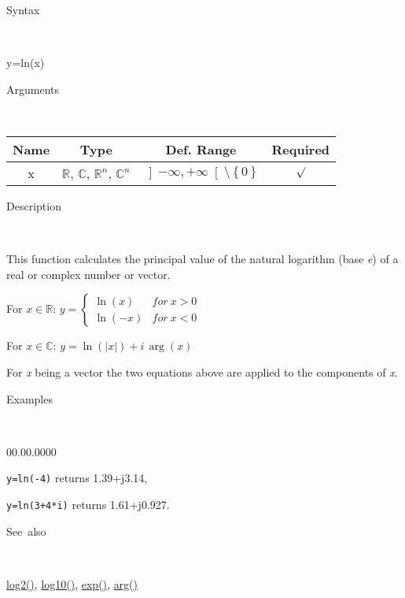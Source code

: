 \begin{description}
\item [Syntax]~
\end{description}
y=ln(x)

\begin{description}
\item [Arguments]~
\end{description}
\begin{tabular}{|c|c|c|c|}
\hline 
Name&
Type&
Def. Range&
Required\tabularnewline
\hline
\hline 
x&
$\mathbb{R}$, $\mathbb{C}$, $\mathbb{R}^{n}$, $\mathbb{C}^{n}$&
$\left]-\infty,+\infty\right[\setminus\left\{ 0\right\} $&
$\surd$\tabularnewline
\hline
\end{tabular}

\begin{description}
\item [Description]~
\end{description}
This function calculates the principal value of the natural logarithm
(base \textit{e}) of a real or complex number or vector.

\medskip{}
For $x\in\mathbb{R}$: $y=\left\{ \begin{array}{cc}
\ln\left(x\right) & for\: x>0\\
\ln\left(-x\right) & for\: x<0\end{array}\right.$ 

\medskip{}
For $x\in\mathbb{C}$: $y=\ln\left(\left|x\right|\right)+i\,\arg\left(x\right)$
\medskip{}

For \textit{x} being a vector the two equations above are
applied to the components of \textit{x}.

\begin{description}
\item [Examples]~
\end{description}
\begin{lyxlist}{00.00.0000}
\item [\texttt{y=ln(-4)}]returns 1.39+j3.14,
\item [\texttt{y=ln(3+4{*}i)}]returns 1.61+j0.927.
\end{lyxlist}
\begin{description}
\item [See~also]~
\end{description}
\textcolor{blue}{\hyperlink{log2}{log2()}}\textcolor{black}{,} \textcolor{blue}{\hyperlink{log10}{log10()}}\textcolor{black}{,}
\textcolor{blue}{\hyperlink{exp}{exp()}}\textcolor{black}{,} \textcolor{blue}{\hyperlink{arg}{arg()}}



